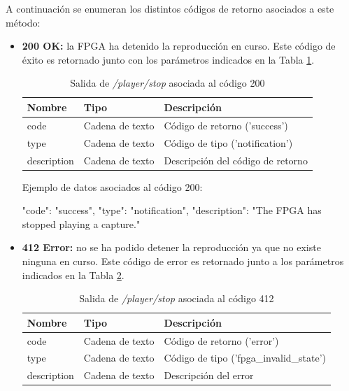 A continuación se enumeran los distintos códigos de retorno asociados a este método:
\begin{itemize}

\item{\textbf{200 OK:} la \gls{FPGA} ha detenido la reproducción en curso. Este código de éxito es retornado junto con los parámetros indicados en la Tabla \ref{extra:api:playerstop:ok}.
\begin{table}[H]
\centering
\begin{tabular}{|l|l|l|}
\hline
\rowcolor[HTML]{F5F5F5}
\textbf{Nombre}  & \textbf{Tipo}   & \textbf{Descripción}              \\ \hline
code             & Cadena de texto & Código de retorno ('success')     \\ \hline
type             & Cadena de texto & Código de tipo ('notification')   \\ \hline
description      & Cadena de texto & Descripción del código de retorno \\ \hline
\end{tabular}
\caption{Salida de \textit{/player/stop} asociada al código 200}
\label{extra:api:playerstop:ok}
\end{table}
\begin{minipage}{\textwidth}
Ejemplo de datos asociados al código 200:

\begin{code}[language=json]
{
  "code": "success",
  "type": "notification",
  "description": "The FPGA has stopped playing a capture."
}
\end{code}
\end{minipage}
}

\item{\textbf{412 Error:} no se ha podido detener la reproducción ya que no existe ninguna en curso. Este código de error es retornado junto a los parámetros indicados en la Tabla \ref{extra:api:playerstop:error}.
\begin{table}[H]
\centering
\begin{tabular}{|l|l|l|}
\hline
\rowcolor[HTML]{F5F5F5}
\textbf{Nombre}  & \textbf{Tipo}   & \textbf{Descripción}                    \\ \hline
code             & Cadena de texto & Código de retorno ('error')             \\ \hline
type             & Cadena de texto & Código de tipo ('fpga\_invalid\_state') \\ \hline
description      & Cadena de texto & Descripción del error                   \\ \hline
\end{tabular}
\caption{Salida de \textit{/player/stop} asociada al código 412}
\label{extra:api:playerstop:error}
\end{table}

}
\end{itemize}
